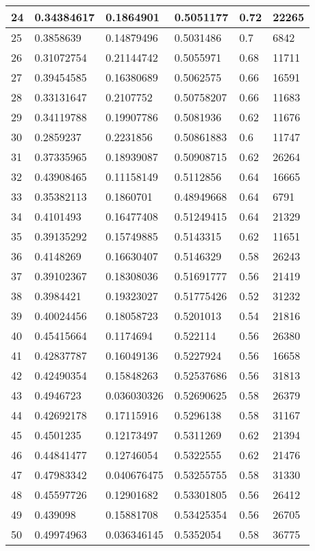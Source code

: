 \begin{longtable}{|l|l|l|l|l|l|}
24 & 0.34384617 & 0.1864901 & 0.5051177 & 0.72 & 22265 \\ \hline 
25 & 0.3858639 & 0.14879496 & 0.5031486 & 0.7 & 6842 \\ \hline 
26 & 0.31072754 & 0.21144742 & 0.5055971 & 0.68 & 11711 \\ \hline 
27 & 0.39454585 & 0.16380689 & 0.5062575 & 0.66 & 16591 \\ \hline 
28 & 0.33131647 & 0.2107752 & 0.50758207 & 0.66 & 11683 \\ \hline 
29 & 0.34119788 & 0.19907786 & 0.5081936 & 0.62 & 11676 \\ \hline 
30 & 0.2859237 & 0.2231856 & 0.50861883 & 0.6 & 11747 \\ \hline 
31 & 0.37335965 & 0.18939087 & 0.50908715 & 0.62 & 26264 \\ \hline 
32 & 0.43908465 & 0.11158149 & 0.5112856 & 0.64 & 16665 \\ \hline 
33 & 0.35382113 & 0.1860701 & 0.48949668 & 0.64 & 6791 \\ \hline 
34 & 0.4101493 & 0.16477408 & 0.51249415 & 0.64 & 21329 \\ \hline 
35 & 0.39135292 & 0.15749885 & 0.5143315 & 0.62 & 11651 \\ \hline 
36 & 0.4148269 & 0.16630407 & 0.5146329 & 0.58 & 26243 \\ \hline 
37 & 0.39102367 & 0.18308036 & 0.51691777 & 0.56 & 21419 \\ \hline 
38 & 0.3984421 & 0.19323027 & 0.51775426 & 0.52 & 31232 \\ \hline 
39 & 0.40024456 & 0.18058723 & 0.5201013 & 0.54 & 21816 \\ \hline 
40 & 0.45415664 & 0.1174694 & 0.522114 & 0.56 & 26380 \\ \hline 
41 & 0.42837787 & 0.16049136 & 0.5227924 & 0.56 & 16658 \\ \hline 
42 & 0.42490354 & 0.15848263 & 0.52537686 & 0.56 & 31813 \\ \hline 
43 & 0.4946723 & 0.036030326 & 0.52690625 & 0.58 & 26379 \\ \hline 
44 & 0.42692178 & 0.17115916 & 0.5296138 & 0.58 & 31167 \\ \hline 
45 & 0.4501235 & 0.12173497 & 0.5311269 & 0.62 & 21394 \\ \hline 
46 & 0.44841477 & 0.12746054 & 0.5322555 & 0.62 & 21476 \\ \hline 
47 & 0.47983342 & 0.040676475 & 0.53255755 & 0.58 & 31330 \\ \hline 
48 & 0.45597726 & 0.12901682 & 0.53301805 & 0.56 & 26412 \\ \hline 
49 & 0.439098 & 0.15881708 & 0.53425354 & 0.56 & 26705 \\ \hline 
50 & 0.49974963 & 0.036346145 & 0.5352054 & 0.58 & 36775 \\ \hline 
\end{longtable}